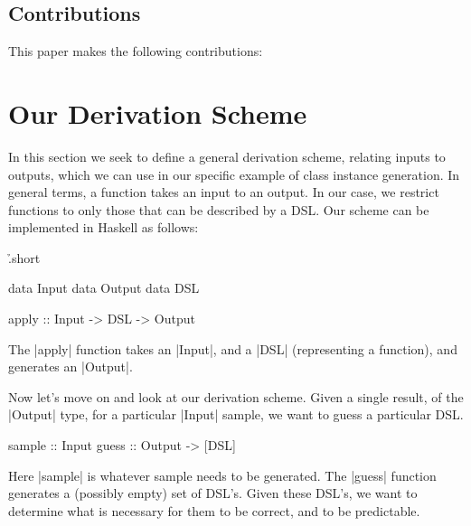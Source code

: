 \documentclass[preprint]{sigplanconf}
\begin{document}
\subsection{Contributions}

This paper makes the following contributions:


\section{Our Derivation Scheme}

In this section we seek to define a general derivation scheme, relating inputs to outputs, which we can use in our specific example of class instance generation. In general terms, a function takes an input to an output. In our case, we restrict functions to only those that can be described by a DSL. Our scheme can be implemented in Haskell as follows:

\h{.short}\begin{code}
data Input
data Output
data DSL

apply :: Input -> DSL -> Output
\end{code}

The |apply| function takes an |Input|, and a |DSL| (representing a function), and generates an |Output|.

Now let's move on and look at our derivation scheme. Given a single result, of the |Output| type, for a particular |Input| sample, we want to guess a particular DSL.

\begin{code}
sample :: Input
guess :: Output -> [DSL]
\end{code}


Here |sample| is whatever sample needs to be generated. The |guess| function generates a (possibly empty) set of DSL's. Given these DSL's, we want to determine what is necessary for them to be correct, and to be predictable.
\end{document}
